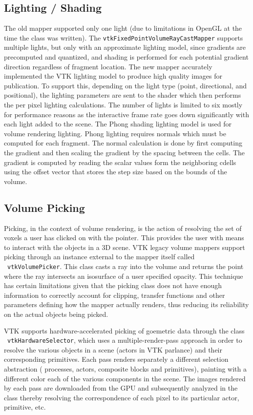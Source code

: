 \subsection{Lighting / Shading}
The old mapper supported only one light (due to limitations in OpenGL at the
time the class was written). The \texttt{vtkFixedPointVolumeRayCastMapper}
supports multiple lights, but only with an approximate lighting model, since
gradients are precomputed and quantized, and shading is performed for each
potential gradient direction regardless of fragment location. The new mapper
accurately implemented the VTK lighting model to produce high quality images for
publication. To support this, depending on the light type (point, directional,
and positional), the lighting parameters are sent to the shader which then
performs the per pixel lighting calculations. The number of lights is limited to
six mostly for performance reasons as the interactive frame rate goes down
significantly with each light added to the scene. The Phong shading lighting
model is used for volume rendering lighting. Phong lighting requires normals
which must be computed for each fragment. The normal calculation is done by
first computing the gradient and then scaling the gradient by the spacing
between the cells. The gradient is computed by reading the scalar values form
the neighboring cdells using the offset vector that stores the step size based
on the bounds of the volume.

\subsection{Volume Picking}
Picking, in the context of volume rendering, is the action of resolving the set
of voxels a user has clicked on with the pointer. This provides the user with
means to interact with the objects in a 3D scene. VTK legacy volume mappers
support picking through an instance external to the mapper itself called
~\texttt{vtkVolumePicker}.  This class casts a ray into the volume and returns
the point where the ray intersects an isosurface of a user specified opacity.
This technique has certain limitations given that the picking class does not
have enough information to correctly account for clipping, transfer functions
and other parameters defining how the mapper actually renders, thus reducing its
reliability on the actual objects being picked.

VTK supports hardware-accelerated picking of goemetric data through the class
~\texttt{vtkHardwareSelector}, which uses a multiple-render-pass approach in
order to resolve the various objects in a scene (actors in VTK parlance) and
their corresponding primitives.  Each pass renders separately a different
selection abstraction ( processes, actors, composite blocks and primitives),
painting with a different color each of the various components in the scene.
The images rendered by each pass are downloaded from the GPU and subsequently
analyzed in the class thereby resolving the correspondence of each pixel to its
particular actor, primitive, etc.

